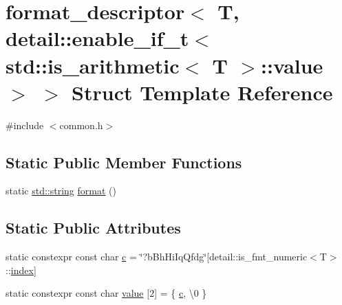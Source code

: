\hypertarget{structformat__descriptor_3_01_t_00_01detail_1_1enable__if__t_3_01std_1_1is__arithmetic_3_01_t_01_4_1_1value_01_4_01_4}{}\section{format\+\_\+descriptor$<$ T, detail\+::enable\+\_\+if\+\_\+t$<$ std\+::is\+\_\+arithmetic$<$ T $>$\+::value $>$ $>$ Struct Template Reference}
\label{structformat__descriptor_3_01_t_00_01detail_1_1enable__if__t_3_01std_1_1is__arithmetic_3_01_t_01_4_1_1value_01_4_01_4}


{\ttfamily \#include $<$common.\+h$>$}

\subsection*{Static Public Member Functions}
\begin{DoxyCompactItemize}
\item 
static \mbox{\hyperlink{_s_d_l__opengl__glext_8h_ab4ccfaa8ab0e1afaae94dc96ef52dde1}{std\+::string}} \mbox{\hyperlink{structformat__descriptor_3_01_t_00_01detail_1_1enable__if__t_3_01std_1_1is__arithmetic_3_01_t_01_4_1_1value_01_4_01_4_aae010efadae20ac375d9800074c80d3b}{format}} ()
\end{DoxyCompactItemize}
\subsection*{Static Public Attributes}
\begin{DoxyCompactItemize}
\item 
static constexpr const char \mbox{\hyperlink{structformat__descriptor_3_01_t_00_01detail_1_1enable__if__t_3_01std_1_1is__arithmetic_3_01_t_01_4_1_1value_01_4_01_4_aeb809d4b5a329d153f7315f68686497e}{c}} = \char`\"{}?b\+Bh\+Hi\+Iq\+Qfdg\char`\"{}\mbox{[}detail\+::is\+\_\+fmt\+\_\+numeric$<$T$>$\+::\mbox{\hyperlink{_s_d_l__opengl__glext_8h_a57f14e05b1900f16a2da82ade47d0c6d}{index}}\mbox{]}
\item 
static constexpr const char \mbox{\hyperlink{structformat__descriptor_3_01_t_00_01detail_1_1enable__if__t_3_01std_1_1is__arithmetic_3_01_t_01_4_1_1value_01_4_01_4_af96da013f06546698f219617697d849a}{value}} \mbox{[}2\mbox{]} = \{ \mbox{\hyperlink{_s_d_l__opengl__glext_8h_a1f2d7f8147412c43ba2303a56f97ee73}{c}}, \textquotesingle{}\textbackslash{}0\textquotesingle{} \}
\end{DoxyCompactItemize}



